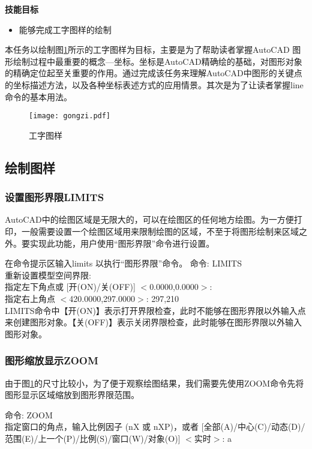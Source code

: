 {\bfseries 技能目标}
\begin{itemize}
\item 能够完成工字图样的绘制
\end{itemize}

本任务以绘制图\ref{fig:shangmu1-1}所示的工字图样为目标，主要是为了帮助读者掌握Auto\-CAD 图形绘制过程中最重要的概念---坐标。坐标是AutoCAD精确绘的基础，对图形对象的精确定位起至关重要的作用。通过完成该任务来理解AutoCAD中图形的关键点的坐标描述方法，以及各种坐标表述方式的应用情景。其次是为了让读者掌握line命令的基本用法。
\enlargethispage{10pt}
\noindent
\begin{figure}[htbp]
\centering
\texttt{[image: gongzi.pdf]}
\caption{工字图样}\label{fig:shangmu1-1}
\end{figure}
\indent

\subsection{绘制图样}
\subsubsection{设置图形界限LIMITS}
AutoCAD中的绘图区域是无限大的，可以在绘图区的任何地方绘图。为一方便打印，一般需要设置一个绘图区域用来限制绘图的区域，不至于将图形绘制来区域之外。要实现此功能，用户使用“图形界限”命令进行设置。

在命令提示区输入limits 以执行“图形界限”命令。
\noindent
命令:  LIMITS\\
重新设置模型空间界限:\\
指定左下角点或 [开(ON)/关(OFF)] $<$0.0000,0.0000$>$:\\
指定右上角点 $<$420.0000,297.0000$>$: 297,210\\
\indent
LIMITS命令中【开(ON)】表示打开界限检查，此时不能够在图形界限以外输入点来创建图形对象。【关(OFF)】表示关闭界限检查，此时能够在图形界限以外输入图形对象。

\subsubsection{图形缩放显示ZOOM}
由于图\ref{fig:shangmu1-1}的尺寸比较小，为了便于观察绘图结果，我们需要先使用ZOOM命令先将图形显示区域缩放到图形界限范围。

\noindent
命令: ZOOM\\
指定窗口的角点，输入比例因子 (nX 或 nXP)，或者
[全部(A)/中心(C)/动态(D)/范围(E)/上一个(P)/比例(S)/窗口(W)/对象(O)] $<$实时$>$: a
\indent

